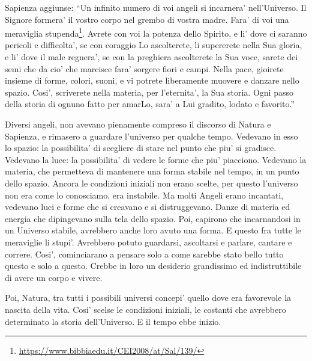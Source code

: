 {  Sapienza aggiunse:
\enquote{Un infinito numero di voi angeli si incarnera' nell'Universo. 
Il Signore formera' il vostro corpo nel grembo di vostra madre. Fara' di voi una meraviglia stupenda\footnote{\url{https://www.bibbiaedu.it/CEI2008/at/Sal/139/}}.
Avrete con voi la potenza dello Spirito, e li' dove ci saranno pericoli e difficolta', se con coraggio Lo ascolterete, li supererete nella Sua gloria, e li' dove il male regnera', se con la preghiera ascolterete la Sua voce, sarete dei semi che da cio' che marcisce fara' sorgere fiori e campi. 
Nella pace, gioirete insieme di forme, colori, suoni, e vi potrete liberamente muovere e danzare nello spazio.  
Cosi', scriverete nella materia, per l'eternita', la Sua storia. Ogni passo della storia di ognuno fatto per amarLo, sara' a Lui gradito, lodato e favorito.}

Diversi angeli, non avevano pienamente compreso il discorso di Natura e Sapienza, e rimasero a guardare l'universo per qualche tempo. 
Vedevano in esso lo spazio: la possibilita' di scegliere di stare nel punto che piu' si gradisce. Vedevano la luce: la possibilita' di vedere le forme che piu' piacciono. Vedevano la materia, che permetteva di mantenere una forma stabile nel tempo, in un punto dello spazio.
  Ancora le condizioni iniziali non erano scelte, per questo l'universo non era come lo conosciamo, era instabile. Ma molti Angeli erano incantati, vedevano luci e forme che si creavano e si distruggevano. Danze di materia ed energia che dipingevano sulla tela dello spazio. Poi, capirono che incarnandosi in un Universo stabile, avrebbero anche loro avuto una forma. E questo fra tutte le meraviglie li stupi'. Avrebbero potuto guardarsi, ascoltarsi e parlare, cantare e correre.
Cosi', cominciarano a pensare solo a come sarebbe stato bello tutto questo e solo a questo. Crebbe in loro un desiderio grandissimo ed indistruttibile di avere un corpo e vivere.

Poi, Natura, tra tutti i possibili universi concepi' quello dove era favorevole la nascita della vita. Cosi' scelse le condizioni iniziali, le costanti che avrebbero determinato la storia dell'Universo. E il tempo ebbe inizio.

}
